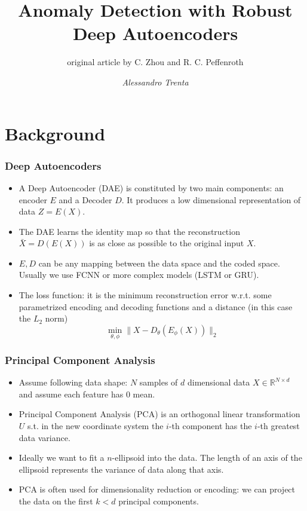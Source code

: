 \documentclass{beamer}
\title[Anomaly Detection with Robust Deep Autoencoders]{Anomaly Detection with Robust Deep Autoencoders} %
\subtitle[]{original article by C. Zhou and R. C. Peffenroth}
\author[Alessandro Trenta]{\emph{Alessandro Trenta}} %
\institute[SNS] %
{Scuola Normale Superiore \\ %
}
\date{} %
\theoremstyle{plain}
\theoremstyle{definition}
\theoremstyle{remark}
\newcommand{\R}{\mathbb{R}}
\newcommand{\norm}[1]{\lVert#1\rVert}
\begin{document}
\begin{frame}
	\titlepage %
\end{frame}

\begin{frame}
	\tableofcontents
\end{frame}

\nocite{RAE}

\section{Background}

\begin{frame}
	\frametitle{Deep Autoencoders}
	\begin{itemize}
		\item A Deep Autoencoder (DAE) is constituted by two main components: an encoder $E$ and a Decoder $D$. It produces a low dimensional representation of data $Z=E(X)$.
		\item The DAE learns the identity map so that the reconstruction $\bar{X}=D(E(X))$ is as close as possible to the original input $X$.
		\item $E, D$ can be any mapping between the data space and the coded space. Usually we use FCNN or more complex models (LSTM or GRU).
		\item The loss function: it is the minimum reconstruction error w.r.t. some parametrized encoding and decoding functions and a distance (in this case the $L_2$ norm)
			\begin{equation}
				\min_{\theta, \phi}{\norm{X-D_{\theta}(E_{\phi}(X))}_{2}}
			\end{equation}
	\end{itemize}
\end{frame}

\begin{frame}
	\frametitle{Principal Component Analysis}
	\begin{itemize}
		\item Assume following data shape: $N$ samples of $d$ dimensional data $X\in \R^{N\times d}$ and assume each feature has $0$ mean.
		\item Principal Component Analysis (PCA) is an orthogonal linear transformation $U$ s.t. in the new coordinate system the $i$-th component has the $i$-th greatest data variance.
		\item Ideally we want to fit a $n$-ellipsoid into the data. The length of an axis of the ellipsoid represents the variance of data along that axis.
		\item PCA is often used for dimensionality reduction or encoding: we can project the data on the first $k<d$ principal components.
	\end{itemize}
\end{frame}
\end{document}
